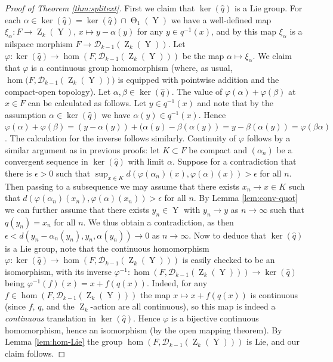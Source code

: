 \documentclass[a4paper,12pt,reqno]{amsart}
\theoremstyle{definition}
\def\to{\rightarrow}
\newcommand{\mc}{\mathcal}
\newcommand{\wh}{\widehat}
\DeclareMathOperator{\ab}{Z}
\DeclareMathOperator{\tran}{\Theta}
\DeclareMathOperator{\nss}{Y}
\begin{document}
\begin{proof}[Proof of Theorem \ref{thm:splitext}]
First we claim that $\ker(\wh{q})$ is a Lie group. For each $\alpha\in \ker(\wh{q})=\ker(\wh{q})\cap\tran_1(\nss)$  we have a well-defined map $\xi_\alpha:F\to \ab_k(\nss)$, $x\mapsto y-\alpha(y)$ for any $y\in q^{-1}(x)$, and by \cite[Lemma 2.9.5]{Cand:Notes2} this map $\xi_\alpha$ is a nilspace morphism $F\to \mc{D}_{k-1}(\ab_k(\nss))$. Let $\varphi:\ker(\wh{q})\to \hom(F,\mc{D}_{k-1}(\ab_k(\nss)))$ be the map $\alpha\mapsto \xi_\alpha$. We claim that $\varphi$ is a continuous group homomorphism (where, as usual, $\hom\big(F,\mc{D}_{k-1}(\ab_k(\nss))\big)$ is equipped with pointwise addition and the compact-open topology). Let $\alpha,\beta\in \ker(\wh{q})$. The value of  $\varphi(\alpha)+\varphi(\beta)$ at $x\in F$ can be calculated as follows. Let $y\in q^{-1}(x)$ and note that by the assumption $\alpha\in \ker(\wh{q})$ we have $\alpha(y)\in q^{-1}(x)$. Hence $\varphi(\alpha)+\varphi(\beta)=(y-\alpha(y))+(\alpha(y)-\beta(\alpha(y)) = y-\beta(\alpha(y)) = \varphi(\beta\alpha)$. The calculation for the inverse follows similarly. Continuity of $\varphi$ follows by a similar argument as in previous proofs: let $K\subset F$ be compact and $(\alpha_n)$ be a convergent sequence in $\ker(\wh{q})$ with limit $\alpha$. Suppose for a contradiction that there is $\epsilon >0$ such that $\sup_{x\in K} d(\varphi(\alpha_n)(x),\varphi(\alpha)(x))>\epsilon$ for all $n$. Then passing to a subsequence we may assume that there exists $x_n\to x\in K$ such that $d(\varphi(\alpha_n)(x_n),\varphi(\alpha)(x_n))>\epsilon$ for all $n$. By Lemma \ref{lem:conv-quot} we can further assume that there exists $y_n\in \nss$ with $y_n\to y$ as $n\to \infty$ such that $q(y_n)=x_n$ for all $n$. We thus obtain a contradiction, as then $\epsilon<d(y_n-\alpha_n(y_n),y_n,\alpha(y_n))\to 0$ as $n\to \infty$. 
Now to deduce that $\ker(\wh{q})$ is a Lie group, note that the continuous homomorphism $\varphi:\ker(\wh{q})\to \hom(F,\mc{D}_{k-1}(\ab_k(\nss)))$ is easily checked to be an isomorphism, with its inverse $\varphi^{-1}:\hom(F,\mc{D}_{k-1}(\ab_k(\nss)))\to \ker(\wh{q})$ being $\varphi^{-1}(f)(x)=x+f(q(x))$. Indeed, for any $f\in \hom(F,\mc{D}_{k-1}(\ab_k(\nss)))$ the map $x\mapsto x+f(q(x))$ is continuous (since $f$, $q$, and the $\ab_k$-action are all continuous), so this map is indeed a \emph{continuous} translation in $\ker(\wh{q})$. Hence $\varphi$ is a bijective continuous homomorphism, hence an isomorphism (by the open mapping theorem). By Lemma \ref{lem:hom-Lie} the group $\hom(F,\mc{D}_{k-1}(\ab_k(\nss)))$ is Lie, and our claim follows.


\end{proof}
\end{document}
